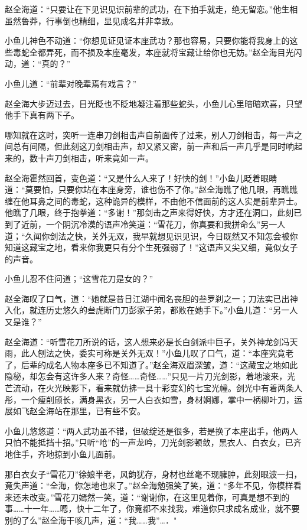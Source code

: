 \documentclass[12pt,oneside]{book}
\begin{document}
赵全海道：``只要让在下见识见识前辈的武功，在下拍手就走，绝无留恋。''他生相虽然鲁莽，行事倒也精细，显见成名并非幸致。

小鱼儿神色不动道：``你想见证见证本座武功？那也容易，只要你能将我身上的这些毒蛇全都弄死，而不损及本座毫发，本座就将宝藏让给你也无妨。''赵全海目光闪动，道：``真的？''

小鱼儿道：``前辈对晚辈焉有戏言？''

赵全海大步迈过去，目光眨也不眨地凝注着那些蛇头，小鱼儿心里暗暗欢喜，只望他手下真有两下子。

哪知就在这时，突听一连串刀剑相击声自前面传了过来，别人刀剑相击，每一声之间总有间隔，但此刻这刀剑相击声，却又紧又密，前一声和后一声几乎是同时响起来的，数十声刀剑相击，听来竟如一声。

赵全海霍然回首，变色道：``又是什么人来了！好快的剑！''小鱼儿眨着眼睛道：``莫要怕，只要你站在本座身旁，谁也伤不了你。''赵全海瞧了他几眼，再瞧瞧缠在他耳鼻之间的毒蛇，这种诡异的模样，不由他不信面前的这人实是前辈异士。他瞧了几眼，终于抱拳道：``多谢！''那剑击之声来得好快，方才还在洞口，此刻已到了近前，一个阴沉冷漠的语声冷笑道：``雪花刀，你真要和我拼命么''另一人道；``久闻你剑法之快，关外无双，我早就想见识见识，今日既然又不知怎会被你知道这藏宝之地，看来你我更只有分个生死强弱了！''这语声又尖又细，竟似女子的声音。

小鱼儿忍不住问道；``这雪花刀是女的？''

赵全海叹了口气，道：``她就是昔日江湖中闻名丧胆的叁罗刹之一；刀法实已出神入化，就连历史悠久的叁虎断门刀彭家子弟，都败在她手下。''小鱼儿道：``另一人又是谁？''

赵全海道：``听雪花刀所说的话，这人想来必是长白剑派中巨子，关外神龙剑冯天雨，此人刨法之快，委实可称是关外无双！''小鱼儿叹了口气，道：``本座究竟老了，后辈的成名人物本座多已不知道了。''赵全海双眉深皱，道：``这藏宝之地如此隐秘，却怎会有这许多人来？奇怪\ldots\ldots 奇怪\ldots\ldots{}''只见一片刀光剑影，着地滚来，光芒流动，在火光映影下，看来就仿拂一具十彩变幻的七宝光幢。剑光中有着两条人彤，一个瘦削颀长，满身黑衣，另一人白衣如雪，身材婀娜，掌中一柄柳叶刀，运展如飞赵全海站在那里，已有些不安。

小鱼儿悠悠道：``两人武功虽不错，但破绽还是很多，若是换了本座出手，他两人只怕不能抵挡十招。''只听``呛''的一声龙吟，刀光剑影顿敛，黑衣人、白衣女，已齐地住手，齐地掠到小鱼儿面前。

那白衣女子``雪花刀''徐娘半老，风韵犹存，身材也丝毫不现臃肿，此刻眼波一扫，竟失声道：``全海，你怎地也来了。''赵全海勉强笑了笑，道：``多年不见，你模样看来还未改变。''雪花刀嫣然一笑，道：``谢谢你，在这里见着你，可真是想不到的事\ldots\ldots 十一年\ldots\ldots 嗯，快十二年了，你竟都不来找我，难道你只求成名成业，就不要别的了么''赵全海干咳几声，道：``我\ldots\ldots 我''\ldots．"
\end{document}
